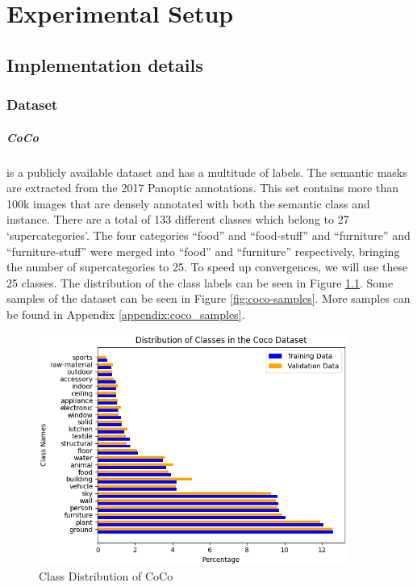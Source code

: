 \chapter{Experimental Setup}\label{chapter:second_real_chapter}

\section{Implementation details}
\subsection{Dataset}
\paragraph{CoCo~\cite{lin2015microsoftcococommonobjects}} is a publicly available dataset and has a multitude of labels. The semantic masks are extracted from the 2017 Panoptic annotations. This set contains more than 100k images that are densely annotated with both the semantic class and instance. There are a total of 133 different classes which belong to 27 `supercategories'. The four categories ``food'' and ``food-stuff'' and ``furniture'' and ``furniture-stuff'' were merged into ``food'' and ``furniture'' respectively, bringing the number of supercategories to 25. To speed up convergences, we will use these 25 classes. The distribution of the class labels can be seen in Figure \ref{fig:coco-class-distribution}. Some samples of the dataset can be seen in Figure \ref{fig:coco-samples}. More samples can be found in Appendix \ref{appendix:coco_samples}. 


\begin{figure}[h]
    \centering
    \includegraphics[width=0.9\textwidth]{figures/datasets/coco/class_distribution.png}
    \caption{Class Distribution of CoCo}
    \label{fig:coco-class-distribution}
\end{figure}

